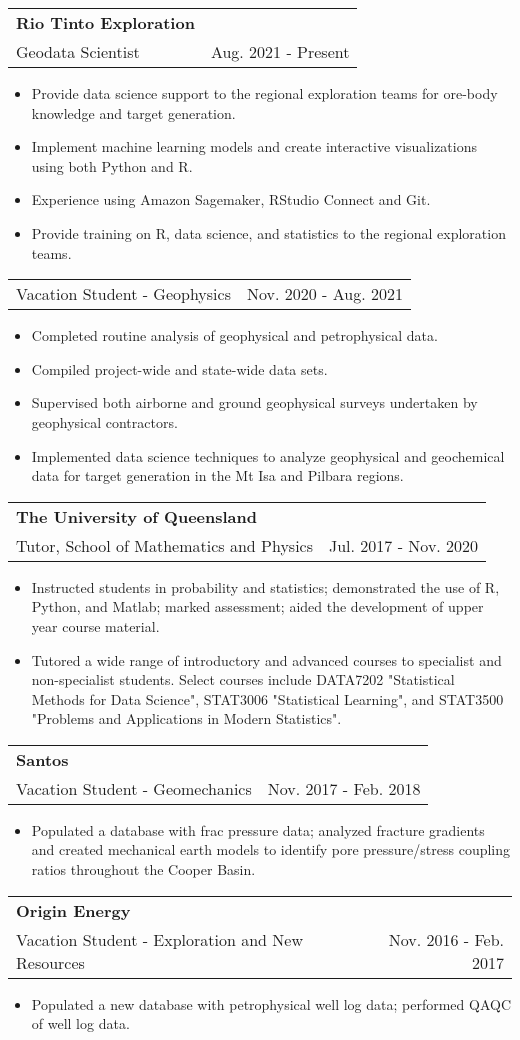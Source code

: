 \documentclass[letterpaper,11pt]{article}
\makeatletter
\newcommand{\resumeItem}[2]{
  \item\small{
    \textbf{#1}{#2 \vspace{-2pt}}
  }
}
\newcommand{\resumeSubheading}[4]{
  \vspace{-1pt}\item
    \begin{tabular*}{0.97\textwidth}[t]{l@{\extracolsep{\fill}}r}
      \textbf{#1} & #2 \\
      {\small #3} & {\small #4} \\
    \end{tabular*}\vspace{-5pt}
}
\newcommand{\resumeSubSubheading}[2]{
    \begin{tabular*}{0.97\textwidth}{l@{\extracolsep{\fill}}r}
      {\small#1} & {\small #2} \\
    \end{tabular*}\vspace{-5pt}
}
\newcommand{\resumeItemListStart}{\begin{itemize}}
\newcommand{\resumeItemListEnd}{\end{itemize}\vspace{-5pt}}
\makeatother
\begin{document}
    \resumeSubheading
      {Rio Tinto Exploration}{}
      {Geodata Scientist}{Aug. 2021 - Present}
      \resumeItemListStart
        \resumeItem{}
          {Provide data science support to the regional exploration teams for ore-body knowledge and target generation.}
        \resumeItem{}
          {Implement machine learning models and create interactive visualizations using both Python and R.}
        \resumeItem{}
          {Experience using Amazon Sagemaker, RStudio Connect and Git.}
        \resumeItem{}
          {Provide training on R, data science, and statistics to the regional exploration teams.}
      \resumeItemListEnd
    \resumeSubSubheading
     {Vacation Student - Geophysics}{Nov. 2020 - Aug. 2021}
     \resumeItemListStart
        \resumeItem{}
          {Completed routine analysis of geophysical and petrophysical data.}
        \resumeItem{}
          {Compiled project-wide and state-wide data sets.}
        \resumeItem{}
          {Supervised both airborne and ground geophysical surveys undertaken by geophysical contractors.}
        \resumeItem{}
          {Implemented data science techniques to analyze geophysical and geochemical data for target generation in the Mt Isa and Pilbara regions.}
     \resumeItemListEnd

    \resumeSubheading
      {The University of Queensland}{}
      {Tutor, School of Mathematics and Physics}{Jul. 2017 - Nov. 2020}
      \resumeItemListStart
        \resumeItem{}
          {Instructed students in probability and statistics; demonstrated the use of R, Python, and Matlab; marked assessment; aided the development of upper year course material.} 
        \resumeItem{}
          {Tutored a wide range of introductory and advanced courses to specialist and non-specialist students. Select courses include DATA7202 "Statistical Methods for Data Science", STAT3006 "Statistical Learning", and STAT3500 "Problems and Applications in Modern Statistics".}
      \resumeItemListEnd

    \resumeSubheading
      {Santos}{}
      {Vacation Student - Geomechanics}{Nov. 2017 - Feb. 2018}
      \resumeItemListStart
        \resumeItem{}
          {Populated a database with frac pressure data; analyzed fracture gradients and created mechanical earth models to identify pore pressure/stress coupling ratios throughout the Cooper Basin.}
      \resumeItemListEnd

    \resumeSubheading
      {Origin Energy}{}
      {Vacation Student - Exploration and New Resources}{Nov. 2016 - Feb. 2017}
      \resumeItemListStart
        \resumeItem{}
          {Populated a new database with petrophysical well log data; performed QAQC of well log data.}
      \resumeItemListEnd
\end{document}
